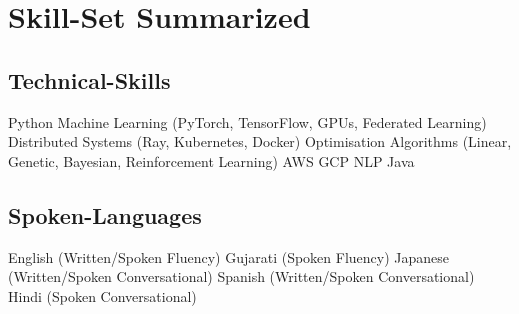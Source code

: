 \documentclass[a4paper]{deedy-resume} %
\begin{document}
\section{Skill-Set Summarized}
\vspace{-10pt}
\begin{multicols}{2}
    \subsection{Technical-Skills}
    Python
    \textbullet{} Machine Learning (PyTorch, TensorFlow, GPUs, Federated Learning)
    \textbullet{} Distributed Systems (Ray, Kubernetes, Docker)
    \textbullet{} Optimisation Algorithms (Linear, Genetic, Bayesian, Reinforcement Learning)
    \textbullet{} AWS
    \textbullet{} GCP
    \textbullet{} NLP
    \textbullet{} Java

    \columnbreak

    \subsection{Spoken-Languages}
    \vspace{-1pt}
    English (Written/Spoken Fluency)
    \textbullet{} Gujarati (Spoken Fluency)
    \textbullet{} Japanese (Written/Spoken Conversational)
    \textbullet{} Spanish (Written/Spoken Conversational)
    \textbullet{} Hindi (Spoken Conversational)
\end{multicols}
\end{document}
